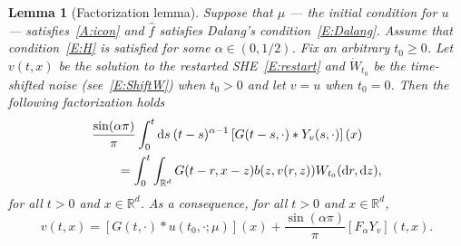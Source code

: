 \documentclass[sn-mathphys]{sn-jnl}%
\renewcommand{\R}{\mathbb{R}}
\newcommand{\ud}{\ensuremath{\mathrm{d}}}
\numberwithin{equation}{section}
\theoremstyle{thmstyleone}%
\newtheorem{lemma}[theorem]{Lemma}
\theoremstyle{thmstyletwo}%
\theoremstyle{thmstylethree}%
\begin{document}
\begin{lemma}[Factorization lemma]\label{L:Factorize}
  Suppose that $\mu$ --- the initial condition for $u$ --- satisfies~\eqref{A:icon} and
  $\widehat{f}$ satisfies Dalang's condition~\eqref{E:Dalang}. Assume that condition~\eqref{E:H} is
  satisfied for some $\alpha\in (0,1/2)$. Fix an arbitrary $ t_0\ge 0$. Let $v(t,x)$ be the solution
  to the restarted SHE~\eqref{E:restart} and $\dot{W}_{t_0}$ be the time-shifted noise
  (see~\eqref{E:ShiftW}) when $t_0>0$ and let $v = u$ when $ t_0 = 0$. Then the following
  factorization holds
  \begin{align*}
    \MoveEqLeft
    \dfrac{\sin(\alpha \pi)}{\pi}  \int_0^t \ud s\: (t-s)^{\alpha-1}\left[G(t-s,\cdot)*Y_v(s,\cdot)\right](x) \\
      & = \int_0^t \int_{\R^d} G(t-r,x-z)b(z,v(r,z)) W_{t_0}(\ud r,\ud z),
  \end{align*}
  for all $t>0$ and $x\in\R^d$. As a consequence, for all $t>0$ and $x\in\R^d$,
  \begin{equation}\label{E:1fac}
    v(t,x) = \left[G(t, \cdot) * u(t_0,\cdot; \mu)\right](x) +\dfrac{\sin(\alpha \pi)}{\pi} \left[F_\alpha Y_v\right](t,x).
  \end{equation}
\end{lemma}
\end{document}
